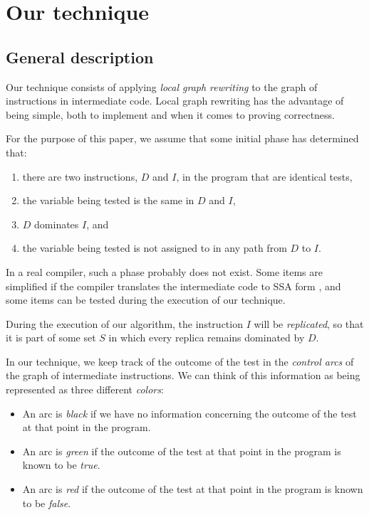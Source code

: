 \section{Our technique}

\subsection{General description}

Our technique consists of applying \emph{local graph rewriting} to the
graph of instructions in intermediate code.  Local graph rewriting has
the advantage of being simple, both to implement and when it comes to
proving correctness.

For the purpose of this paper, we assume that some initial phase has
determined that:

\begin{enumerate}
\item there are two instructions, $D$ and $I$, in the program that
  are identical tests,
\item the variable being tested is the same in $D$ and $I$,
\item $D$ dominates $I$, and
\item the variable being tested is not assigned to in any path from
  $D$ to $I$.
\end{enumerate}

In a real compiler, such a phase probably does not exist.  Some items
are simplified if the compiler translates the intermediate code to SSA
form \cite{Cytron:1989:EMC:75277.75280,
  Cytron:1991:ECS:115372.115320}, and some items can be tested during
the execution of our technique.

During the execution of our algorithm, the instruction $I$ will be
\emph{replicated}, so that it is part of some set $S$ in which every
replica remains dominated by $D$.

In our technique, we keep track of the outcome of the test in the
\emph{control arcs} of the graph of intermediate instructions.
We can think of this information as being represented as three
different \emph{colors}:

\begin{itemize}
\item An arc is \emph{black} if we have no information concerning the
  outcome of the test at that point in the program.
\item An arc is \emph{green} if the outcome of the test at that point in
  the program is known to be \emph{true}.
\item An arc is \emph{red} if the outcome of the test at that point in
  the program is known to be \emph{false}.
\end{itemize}

